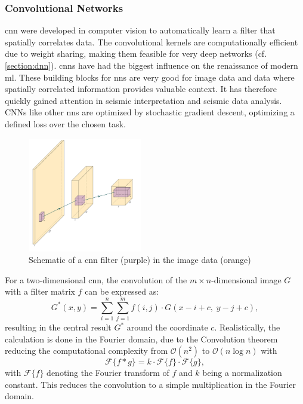 \subsubsection{Convolutional Networks}
\label{section:cnn}
\acf{cnn} were developed in computer vision to automatically learn a filter that spatially correlates data. The convolutional kernels are computationally efficient due to weight sharing, making them feasible for very deep networks (cf. \cref{section:dnn}). \acp{cnn} have had the biggest influence on the renaissance of modern \ac{ml}. These building blocks for \acp{nn} are very good for image data and data where spatially correlated information provides valuable context. It has therefore quickly gained attention in seismic interpretation and seismic data analysis. CNNs like other \acp{nn} are optimized by stochastic gradient descent, optimizing a defined loss over the chosen task.

\begin{figure}[H]
    \centering
    \includegraphics[width=\textwidth,height=5cm,keepaspectratio]{figures/cnn_schema.pdf}
    \caption{Schematic of a \ac{cnn} filter (purple) in the image data (orange)}
    \label{fig:cnn}
\end{figure}

For a two-dimensional \ac{cnn}, the convolution of the $m\times n$-dimensional image $G$ with a filter matrix $f$ can be expressed as:
\begin{equation}
G^{*}(x,y) = \sum_{i=1}^{n} \sum_{j=1}^{m} f(i,j)\cdot G(x-i+c,\; y-j+c),
\end{equation}
resulting in the central result $G^{*}$ around the coordinate $c$. Realistically, the calculation is done in the Fourier domain, due to the Convolution theorem reducing the computational complexity from $\mathcal{O}(n^2)$ to $\mathcal{O}(n \log n)$ with
\begin{equation}
    \mathcal{F}\{f * g\} = k\cdot \mathcal{F}\{f\}\cdot \mathcal{F}\{g\},
\end{equation}
with $\mathcal{F} \{ f\}$ denoting the Fourier transform of $f$ and $k$ being a normalization constant. This reduces the convolution to a simple multiplication in the Fourier domain.

